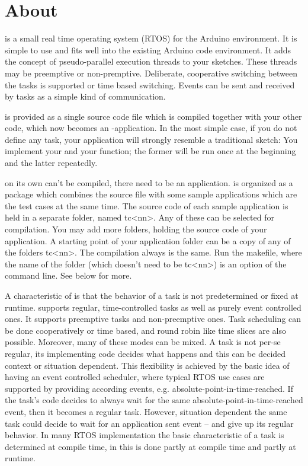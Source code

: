 \chapter{About \rtos{}}
\label{secAbout}

\rtos{} is a small real time operating system (RTOS) for the Arduino
environment. It is simple to use and fits well into the existing Arduino
code environment. It adds the concept of pseudo-parallel execution threads
to your sketches. These threads may be preemptive or non-premptive.
Deliberate, cooperative switching between the tasks is supported or time
based switching. Events can be sent and received by tasks as a simple kind
of communication.

\rtos{} is provided as a single source code file which is compiled together
with your other code, which now becomes an \rtos-application. In the most
simple case, if you do not define any task, your application will strongly
resemble a traditional sketch: You implement your  and your
 function; the former will be run once at the beginning and
the latter repeatedly.

\rtos{} on its own can't be compiled, there need to be an application.
\rtos{} is organized as a package which combines the \rtos{} source file
with some sample applications which are the test cases at the same time.
The source code of each sample application is held in a separate folder,
named tc\textless nn\textgreater. Any of these can be selected for
compilation. You may add more folders, holding the source code of your
\rtos{} application. A starting point of your application folder can be a
copy of any of the folders tc\textless nn\textgreater. The compilation
always is the same. Run the makefile, where the name of the folder (which
doesn't need to be tc\textless nn\textgreater) is an option of the
command line. See below for more.

A characteristic of \rtos{} is that the behavior of a task is not
predetermined or fixed at runtime. \rtos{} supports regular,
time-controlled tasks as well as purely event controlled ones. It supports
preemptive tasks and non-preemptive ones. Task scheduling can be done
cooperatively or time based, and round robin like time slices are also
possible. Moreover, many of these modes can be mixed. A task is not per-se
regular, its implementing code decides what happens and this can be
decided context or situation dependent. This flexibility is achieved by
the basic idea of having an event controlled scheduler, where typical RTOS
use cases are supported by providing according events, e.g.
absolute-point-in-time-reached. If the task's code decides to always wait
for the same absolute-point-in-time-reached event, then it becomes a
regular task. However, situation dependent the same task could decide to
wait for an application sent event -- and give up its regular behavior. In
many RTOS implementation the basic characteristic of a task is determined
at compile time, in \rtos{} this is done partly at compile time and partly
at runtime.


